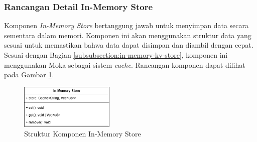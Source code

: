 \subsubsection{Rancangan Detail In-Memory Store}
\label{subsubsection:detail-in-memory-store}

Komponen \textit{In-Memory Store} bertanggung jawab untuk menyimpan data secara sementara dalam memori. Komponen ini akan menggunakan struktur data yang sesuai untuk memastikan bahwa data dapat disimpan dan diambil dengan cepat. Sesuai dengan Bagian \ref{subsubsection:in-memory-kv-store}, komponen ini menggunakan Moka sebagai sistem \textit{cache}. Rancangan komponen dapat dilihat pada Gambar \ref{fig:in-memory-store-component}.

\begin{figure}[ht]
	\centering
	\includegraphics[width=0.4\textwidth]{resources/chapter-3/in-memory-store-component.png}
	\caption{Struktur Komponen In-Memory Store}
	\label{fig:in-memory-store-component}
\end{figure}